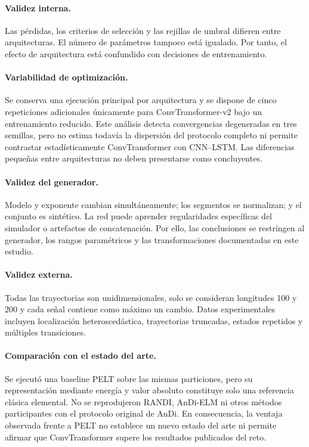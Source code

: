 \documentclass[a4paper,12pt]{article}
\begin{document}
\paragraph{Validez interna.} Las pérdidas, los criterios de selección y las rejillas de umbral difieren entre arquitecturas. El número de parámetros tampoco está igualado. Por tanto, el efecto de arquitectura está confundido con decisiones de entrenamiento.

\paragraph{Variabilidad de optimización.} Se conserva una ejecución principal por arquitectura y se dispone de cinco repeticiones adicionales únicamente para ConvTransformer-v2 bajo un entrenamiento reducido. Este análisis detecta convergencias degeneradas en tres semillas, pero no estima todavía la dispersión del protocolo completo ni permite contrastar estadísticamente ConvTransformer con CNN--LSTM. Las diferencias pequeñas entre arquitecturas no deben presentarse como concluyentes.

\paragraph{Validez del generador.} Modelo y exponente cambian simultáneamente; los segmentos se normalizan; y el conjunto es sintético. La red puede aprender regularidades específicas del simulador o artefactos de concatenación. Por ello, las conclusiones se restringen al generador, los rangos paramétricos y las transformaciones documentadas en este estudio.

\paragraph{Validez externa.} Todas las trayectorias son unidimensionales, solo se consideran longitudes 100 y 200 y cada señal contiene como máximo un cambio. Datos experimentales incluyen localización heteroscedástica, trayectorias truncadas, estados repetidos y múltiples transiciones.

\paragraph{Comparación con el estado del arte.} Se ejecutó una baseline PELT sobre las mismas particiones, pero su representación mediante energía y valor absoluto constituye solo una referencia clásica elemental. No se reprodujeron RANDI, AnDi-ELM ni otros métodos participantes con el protocolo original de AnDi. En consecuencia, la ventaja observada frente a PELT no establece un nuevo estado del arte ni permite afirmar que ConvTransformer supere los resultados publicados del reto.
\end{document}
